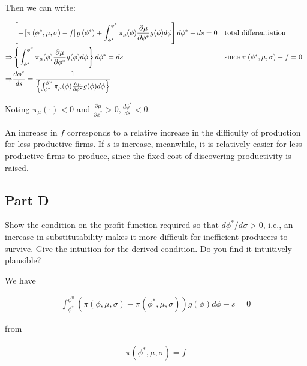 \documentclass[10pt]{article}
\begin{document}
Then we can write:

\begin{align}
    &\left[-\left[\pi\left(\phi^*, \mu, \sigma\right)-f\right] g\left(\phi^*\right)+\int_{\phi^*}^{\phi^*} \pi_\mu(\phi) \frac{\partial \mu}{\partial \phi^*} g(\phi) d \phi\right] d \phi^*-d s=0 && \parbox[t]{4cm}{\raggedright total differentiation} \\
    \Rightarrow & \left\{\int_{\phi^*}^{\phi^u} \pi_\mu(\phi) \frac{\partial \mu}{\partial \phi^*} g(\phi) d \phi\right\} d \phi^*=d s && \parbox[t]{4cm}{\raggedright since $\pi\left(\phi^*, \mu, \sigma\right)-f=0$} \\
    \Rightarrow &\frac{d \phi^*}{d s}=\frac{1}{\left\{\int_{\phi^*}^{\phi^u} \pi_\mu(\phi) \frac{\partial \mu}{\partial \phi^*} g(\phi) d \phi\right\}}
\end{align}

Noting $\pi_\mu(\cdot)<0$ and $\frac{\partial \mu}{\partial \phi^*}>0, \frac{d \phi^*}{d s}<0$.


An increase in $f$ corresponds to a relative increase in the 
difficulty of production for less productive firms. If $s$ 
is increase, meanwhile, it is relatively easier for 
less productive firms to produce, since the fixed cost
of discovering productivity is raised. 

\subsection{Part D}

Show the condition on the profit function required so that $d \phi^* / d \sigma>0$, i.e., an increase in substitutability makes it more difficult for inefficient producers to survive. Give the intuition for the derived condition. Do you find it intuitively plausible?

\hrulefill\hspace{0.5em}\dotfill\hspace{0.5em}\hrulefill

We have

\begin{align}
    \int_{\phi^*}^{\phi^u}\left(\pi(\phi, \mu, \sigma)-\pi\left(\phi^*, \mu, \sigma\right)\right) g(\phi) d \phi-s=0
\end{align}

from 

\begin{align}
    \pi\left(\phi^*, \mu, \sigma\right)=f
\end{align}
\end{document}
